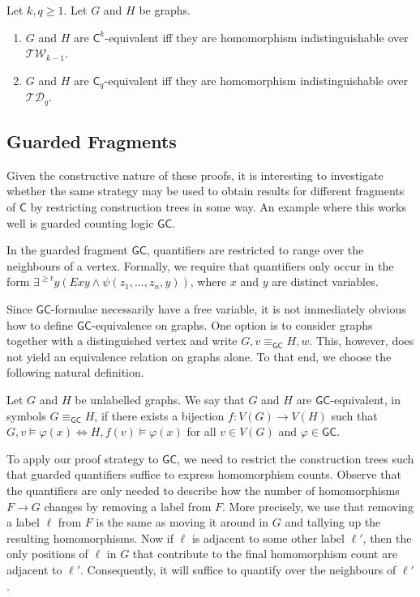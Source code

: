\documentclass[a4paper,UKenglish,cleveref, autoref, thm-restate]{lipics-v2021}
\newcommand{\lC} {\ensuremath{\mathsf C}}
\newcommand{\lGC}{\ensuremath{\mathsf{GC}}}
\begin{document}
    \begin{corollary}
  	Let $k, q \geq 1$. Let $G$ and $H$ be graphs.
  	\begin{enumerate}
  		\item $G$ and $H$ are $\lC^k$-equivalent iff they are homomorphism indistinguishable over $\mathcal{TW}_{k-1}$.
  		\item $G$ and $H$ are $\lC_q$-equivalent iff they are homomorphism indistinguishable over $\mathcal{TD}_q$.
  	\end{enumerate}
      \end{corollary}

 
\subsection{Guarded Fragments}
\label{subsec:gckq}
Given the constructive nature of these proofs, it is interesting to investigate whether the same strategy may be used to obtain results for different fragments of $\lC$ by restricting construction trees in some way. An example where this works well is guarded counting logic $\lGC$.

In the guarded fragment $\lGC$, quantifiers are restricted to range over the neighbours of a vertex. Formally, we require that quantifiers only occur in the form $\exists^{\geq t}y (Exy \land \psi(z_1, \dots, z_n, y))$, where $x$ and $y$ are distinct variables.

Since $\lGC$-formulae necessarily have a free variable, it is not immediately obvious how to define $\lGC$-equivalence on graphs. One option is to consider graphs together with a distinguished vertex and write $G, v \equiv_\lGC H, w$. This, however, does not yield an equivalence relation on graphs alone. To that end, we choose the following natural definition.

\begin{definition}\label{def:gcequiv}
  Let $G$ and $H$ be unlabelled graphs. We say that $G$ and $H$ are $\textsf{GC}$-equivalent, in symbols $G \equiv_{\mathsf{GC}} H$, if there exists a bijection $f \colon V(G) \to V(H)$ such that $G, v \models \varphi(x) \iff H, f(v) \models \varphi(x)$ for all $v \in V(G)$ and $\varphi \in \mathsf{GC}$.
\end{definition}

To apply our proof strategy to $\lGC$, we need to restrict the construction trees such that guarded quantifiers suffice to express homomorphism counts. Observe that the quantifiers are only needed to describe how the number of homomorphisms $F \to G$ changes by removing a label from $F$. More precisely, we use that removing a label $\ell$ from $F$ is the same as moving it around in $G$ and tallying up the resulting homomorphisms. Now if $\ell$ is adjacent to some other label $\ell'$, then the only positions of $\ell$ in $G$ that contribute to the final homomorphism count are adjacent to $\ell'$. Consequently, it will suffice to quantify over the neighbours of $\ell'$.
\end{document}
